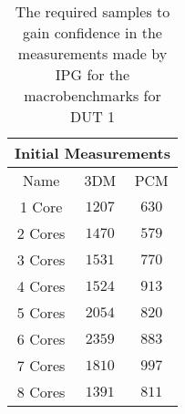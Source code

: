 \begin{table}[H]
    \centering
    \begin{tabular}{|| c | c | c ||}
    \hline
    \multicolumn{3}{||c||}{Initial Measurements} \\ [0.5ex] \hline\hline
    Name & 3DM & PCM \\\hline
    1 Core & $1207$ & $630$ \\
    2 Cores & $1470$ & $579$ \\
    3 Cores & $1531$ & $770$ \\
    4 Cores & $1524$ & $913$ \\
    5 Cores & $2054$ & $820$ \\
    6 Cores & $2359$ & $883$ \\
    7 Cores & $1810$ & $997$ \\
    8 Cores & $1391$ & $811$ \\\hline
    \end{tabular}
    \caption{The required samples to gain confidence in the measurements made by IPG for the macrobenchmarks for DUT 1}
    \label{tab:initial-measurements-exp-3-dut-1-app}
\end{table}